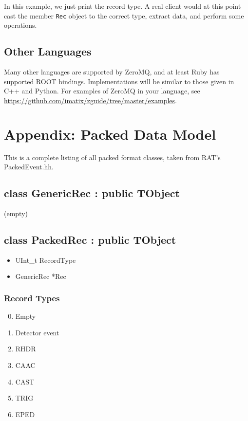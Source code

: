 \documentclass{article}
\begin{document}
In this example, we just print the record type. A real client would at this point cast the member {\tt Rec} object to the correct type, extract data, and perform some operations.

\subsection{Other Languages}
Many other languages are supported by ZeroMQ, and at least Ruby has supported ROOT bindings. Implementations will be similar to those given in C++ and Python. For examples of ZeroMQ in your language, see \href{https://github.com/imatix/zguide/tree/master/examples}{https://github.com/imatix/zguide/tree/master/examples}.

\clearpage
\section{Appendix: Packed Data Model}
This is a complete listing of all packed format classes, taken from RAT's PackedEvent.hh.

\subsection{class GenericRec : public TObject}
(empty)

\subsection{class PackedRec : public TObject}
\begin{itemize}
\item UInt\_t RecordType
\item GenericRec *Rec
\end{itemize}

\subsubsection{Record Types}
\begin{enumerate}
\setcounter{enumi}{-1}
\item Empty
\item Detector event
\item RHDR
\item CAAC
\item CAST
\item TRIG
\item EPED
\end{enumerate}
\end{document}
